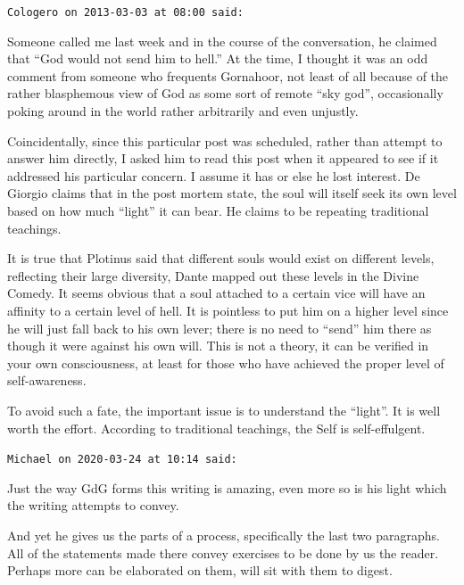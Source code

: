 \begin{footnotesize}
\begin{sffamily}
\hfill

\texttt{Cologero on 2013-03-03 at 08:00 said:}

Someone called me last week and in the course of the conversation, he claimed that ``God would not send him to hell.'' At the time, I thought it was an odd comment from someone who frequents Gornahoor, not least of all because of the rather blasphemous view of God as some sort of remote ``sky god'', occasionally poking around in the world rather arbitrarily and even unjustly.

Coincidentally, since this particular post was scheduled, rather than attempt to answer him directly, I asked him to read this post when it appeared to see if it addressed his particular concern. I assume it has or else he lost interest. De Giorgio claims that in the post mortem state, the soul will itself seek its own level based on how much ``light'' it can bear. He claims to be repeating traditional teachings.

It is true that Plotinus said that different souls would exist on different levels, reflecting their large diversity, Dante mapped out these levels in the Divine Comedy. It seems obvious that a soul attached to a certain vice will have an affinity to a certain level of hell. It is pointless to put him on a higher level since he will just fall back to his own lever; there is no need to ``send'' him there as though it were against his own will. This is not a theory, it can be verified in your own consciousness, at least for those who have achieved the proper level of self-awareness.

To avoid such a fate, the important issue is to understand the ``light''. It is well worth the effort. According to traditional teachings, the Self is self-effulgent.

\hfill

\texttt{Michael on 2020-03-24 at 10:14 said:}

Just the way GdG forms this writing is amazing, even more so is his light which the writing attempts to convey.

And yet he gives us the parts of a process, specifically the last two paragraphs. All of the statements made there convey exercises to be done by us the reader. Perhaps more can be elaborated on them, will sit with them to digest.

\end{sffamily}
\end{footnotesize}

